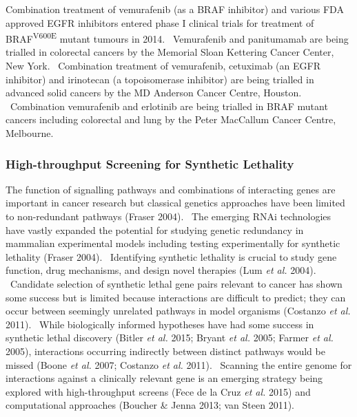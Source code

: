 Combination treatment of vemurafenib (as a BRAF inhibitor) and various FDA approved EGFR inhibitors entered phase I clinical trials for treatment of BRAF\textsuperscript{V600E} mutant tumours in 2014. \ Vemurafenib and panitumamab are being trialled in colorectal cancers by the Memorial Sloan Kettering Cancer Center, New York. \ Combination treatment of vemurafenib, cetuximab (an EGFR inhibitor) and irinotecan (a topoisomerase inhibitor) are being trialled in advanced solid cancers by the MD Anderson Cancer Centre, Houston. \ Combination vemurafenib and erlotinib are being trialled in BRAF mutant cancers including colorectal and lung by the Peter MacCallum Cancer Centre, Melbourne. \  

\subsubsection[High{}-throughput Screening for Synthetic Lethality]{High-throughput Screening for Synthetic Lethality}

The function of signalling pathways and combinations of interacting genes are important in cancer research but classical genetics approaches have been limited to non-redundant pathways (Fraser 2004). \ The emerging RNAi technologies have vastly expanded the potential for studying genetic redundancy in mammalian experimental models including testing experimentally for synthetic lethality (Fraser 2004). \ Identifying synthetic lethality is crucial to study gene function, drug mechanisms, and design novel therapies (Lum\textit{ et al.} 2004). \ Candidate selection of synthetic lethal gene pairs relevant to cancer has shown some success but is limited because interactions are difficult to predict; they can occur between seemingly unrelated pathways in model organisms (Costanzo\textit{ et al.} 2011). \ While biologically informed hypotheses have had some success in synthetic lethal discovery (Bitler\textit{ et al.} 2015; Bryant\textit{ et al.} 2005; Farmer\textit{ et al.} 2005), interactions occurring indirectly between distinct pathways would be missed (Boone\textit{ et al.} 2007; Costanzo\textit{ et al.} 2011). \ Scanning the entire genome for interactions against a clinically relevant gene is an emerging strategy being explored with high-throughput screens (Fece de la Cruz\textit{ et al.} 2015) and computational approaches (Boucher \& Jenna 2013; van Steen 2011). \  

